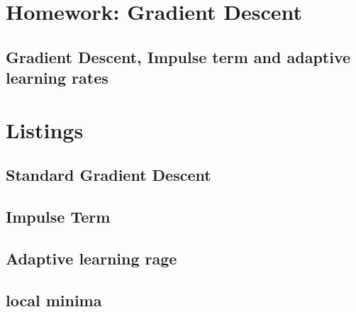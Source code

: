 
\chapter{Homework: Gradient Descent}
\section{Gradient Descent, Impulse term and adaptive learning rates}





\clearpage
\newpage

\chapter{Listings}
\section{Standard Gradient Descent}

\section{Impulse Term}

\section{Adaptive learning rage}

\section{local minima}







%
%

\FloatBarrier\label{end-of-document}


